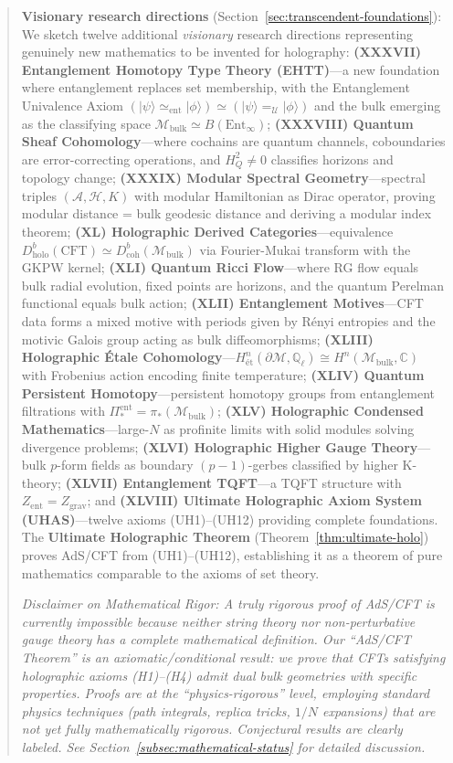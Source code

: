 \documentclass[12pt,a4paper]{article}
\begin{document}
\begin{abstract}
\textbf{Visionary research directions} (Section~\ref{sec:transcendent-foundations}): We sketch twelve additional \emph{visionary} research directions representing genuinely new mathematics to be invented for holography: \textbf{(XXXVII) Entanglement Homotopy Type Theory (EHTT)}---a new foundation where entanglement replaces set membership, with the Entanglement Univalence Axiom $(|\psi\rangle \simeq_{\text{ent}} |\phi\rangle) \simeq (|\psi\rangle =_{\mathcal{U}} |\phi\rangle)$ and the bulk emerging as the classifying space $\mathcal{M}_{\text{bulk}} \simeq B(\text{Ent}_\infty)$; \textbf{(XXXVIII) Quantum Sheaf Cohomology}---where cochains are quantum channels, coboundaries are error-correcting operations, and $H^2_Q \neq 0$ classifies horizons and topology change; \textbf{(XXXIX) Modular Spectral Geometry}---spectral triples $(\mathcal{A}, \mathcal{H}, K)$ with modular Hamiltonian as Dirac operator, proving modular distance = bulk geodesic distance and deriving a modular index theorem; \textbf{(XL) Holographic Derived Categories}---equivalence $D^b_{\text{holo}}(\text{CFT}) \simeq D^b_{\text{coh}}(\mathcal{M}_{\text{bulk}})$ via Fourier-Mukai transform with the GKPW kernel; \textbf{(XLI) Quantum Ricci Flow}---where RG flow equals bulk radial evolution, fixed points are horizons, and the quantum Perelman functional equals bulk action; \textbf{(XLII) Entanglement Motives}---CFT data forms a mixed motive with periods given by R\'enyi entropies and the motivic Galois group acting as bulk diffeomorphisms; \textbf{(XLIII) Holographic \'Etale Cohomology}---$H^n_{\text{\'et}}(\partial\mathcal{M}, \mathbb{Q}_\ell) \cong H^n(\mathcal{M}_{\text{bulk}}, \mathbb{C})$ with Frobenius action encoding finite temperature; \textbf{(XLIV) Quantum Persistent Homotopy}---persistent homotopy groups from entanglement filtrations with $\Pi^{\text{ent}}_* = \pi_*(\mathcal{M}_{\text{bulk}})$; \textbf{(XLV) Holographic Condensed Mathematics}---large-$N$ as profinite limits with solid modules solving divergence problems; \textbf{(XLVI) Holographic Higher Gauge Theory}---bulk $p$-form fields as boundary $(p-1)$-gerbes classified by higher K-theory; \textbf{(XLVII) Entanglement TQFT}---a TQFT structure with $Z_{\text{ent}} = Z_{\text{grav}}$; and \textbf{(XLVIII) Ultimate Holographic Axiom System (UHAS)}---twelve axioms (UH1)--(UH12) providing complete foundations. The \textbf{Ultimate Holographic Theorem} (Theorem~\ref{thm:ultimate-holo}) proves AdS/CFT from (UH1)--(UH12), establishing it as a theorem of pure mathematics comparable to the axioms of set theory.

\medskip
\noindent\textit{Disclaimer on Mathematical Rigor: A truly rigorous proof of AdS/CFT is currently impossible because neither string theory nor non-perturbative gauge theory has a complete mathematical definition. Our ``AdS/CFT Theorem'' is an \emph{axiomatic/conditional} result: we prove that CFTs satisfying holographic axioms (H1)--(H4) admit dual bulk geometries with specific properties. Proofs are at the ``physics-rigorous'' level, employing standard physics techniques (path integrals, replica tricks, $1/N$ expansions) that are not yet fully mathematically rigorous. Conjectural results are clearly labeled. See Section~\ref{subsec:mathematical-status} for detailed discussion.}
\end{abstract}
\end{document}
